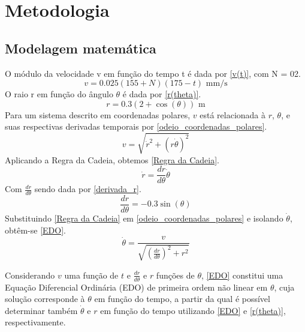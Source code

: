 \documentclass[12pt,a4paper]{article}
\begin{document}
\vspace{0.5\baselineskip}

\section{Metodologia}

\vspace{0.5\baselineskip}
\subsection{Modelagem matemática}

\noindent O módulo da velocidade v em função do tempo t é dada por \eqref{v(t)}, com N = 02.
\begin{equation}
    \label{v(t)}
    v = 0.025(155 + N)(175 - t)\text{ mm/s}
\end{equation}
O raio r em função do ângulo $\theta$ é dada por \eqref{r(theta)}.
\begin{equation}
    \label{r(theta)}
    r = 0.3(2 + \cos(\theta))\text{ m}
\end{equation}
Para um sistema descrito em coordenadas polares, $v$ está relacionada à $r$, $\theta$, e suas respectivas derivadas temporais por \eqref{odeio_coordenadas_polares}.
\begin{equation}
    \label{odeio_coordenadas_polares}
    v = \sqrt{\dot{r}^2 + (r\dot{\theta})^2}
\end{equation}
Aplicando a Regra da Cadeia, obtemos \eqref{Regra da Cadeia}.
\begin{equation}
    \label{Regra da Cadeia}
    \dot{r} = \frac{dr}{d\theta}\dot{\theta}
\end{equation}
Com $\frac{dr}{d\theta}$ sendo dada por \eqref{derivada_r}.
\begin{equation}
    \label{derivada_r}
    \frac{dr}{d\theta} = -0.3\sin(\theta)
\end{equation}
Substituindo \eqref{Regra da Cadeia} em \eqref{odeio_coordenadas_polares} e isolando $\dot{\theta}$, obtêm-se \eqref{EDO}.
\begin{equation}
    \label{EDO}
    \dot{\theta} = \frac{v}{\sqrt{\left(\frac{dr}{d\theta}\right)^2 + r^2}}
\end{equation}
\par Considerando $v$ uma função de $t$ e $\frac{dr}{d\theta}$ e $r$ funções de $\theta$, \eqref{EDO} constitui uma Equação Diferencial Ordinária (EDO) de primeira ordem não linear em $\theta$, cuja solução corresponde à $\theta$ em função do tempo, a partir da qual é possível determinar também $\dot{\theta}$ e $r$ em função do tempo utilizando \eqref{EDO} e \eqref{r(theta)}, respectivamente. 
\vspace{0.5\baselineskip}
\end{document}
